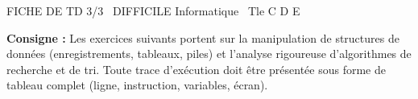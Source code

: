 \documentclass[11pt]{article}
\begin{document}
\begin{tcolorbox}[enhanced,colback=popink,colframe=popink,arc=10pt,boxrule=0pt,left=12pt,right=12pt,top=9pt,bottom=9pt]
{\color{white}\popxbold\small FICHE DE TD 3/3 \textbullet\ DIFFICILE \hfill Informatique \textbullet\ Tle C D E\par}
\end{tcolorbox}
\vspace{4pt}
\noindent\textbf{Consigne :} Les exercices suivants portent sur la manipulation de structures de données (enregistrements, tableaux, piles) et l'analyse rigoureuse d'algorithmes de recherche et de tri. Toute trace d'exécution doit être présentée sous forme de tableau complet (ligne, instruction, variables, écran).
\end{document}
